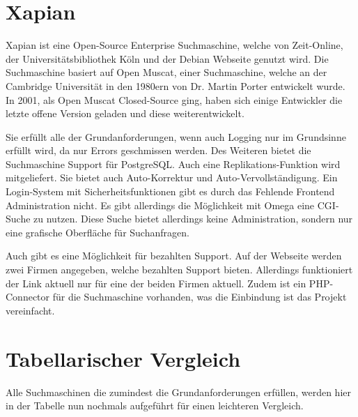 \section{Xapian}
\label{xapian}

Xapian ist eine Open-Source Enterprise Suchmaschine, welche von Zeit-Online, der Universitätsbibliothek Köln und der Debian Webseite genutzt wird. Die Suchmaschine basiert auf Open Muscat, einer Suchmaschine, welche an der Cambridge Universität in den 1980ern von Dr. Martin Porter entwickelt wurde. In 2001, als Open Muscat Closed-Source ging, haben sich einige Entwickler die letzte offene Version geladen und diese weiterentwickelt.

Sie erfüllt alle der Grundanforderungen, wenn auch Logging nur im Grundsinne erfüllt wird, da nur Errors geschmissen werden. Des Weiteren bietet die Suchmaschine Support für PostgreSQL. Auch eine Replikations-Funktion wird mitgeliefert. Sie bietet auch Auto-Korrektur und Auto-Vervollständigung. Ein Login-System mit Sicherheitsfunktionen gibt es durch das Fehlende Frontend Administration nicht. Es gibt allerdings die Möglichkeit mit Omega eine CGI-Suche zu nutzen. Diese Suche bietet allerdings keine Administration, sondern nur eine grafische Oberfläche für Suchanfragen.

Auch gibt es eine Möglichkeit für bezahlten Support. Auf der Webseite werden zwei Firmen angegeben, welche bezahlten Support bieten. Allerdings funktioniert der Link aktuell nur für eine der beiden Firmen aktuell. Zudem ist ein PHP-Connector für die Suchmaschine vorhanden, was die Einbindung ist das Projekt vereinfacht. \cite{XAP.2019}

\section {Tabellarischer Vergleich}

Alle Suchmaschinen die zumindest die Grundanforderungen erfüllen, werden hier in der Tabelle nun nochmals aufgeführt für einen leichteren Vergleich. 

